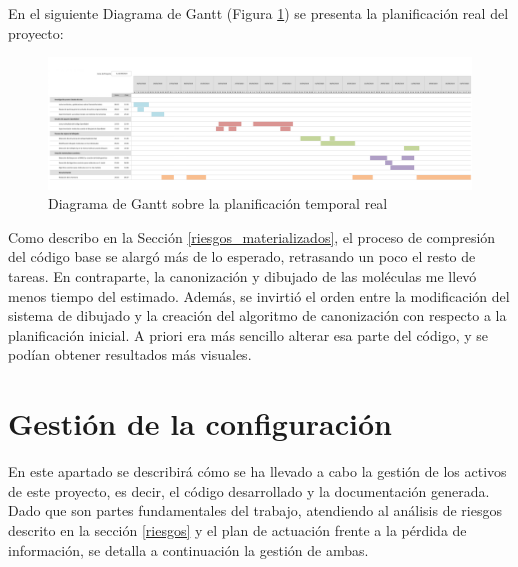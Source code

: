 \begin{landscape}

En el siguiente Diagrama de Gantt (Figura \ref{fig:gantt_real}) se presenta la planificación real del proyecto:

    \begin{figure}[h!]
        \centering
        \includegraphics[scale=0.9]{imagenes/planificacion/planificacion_real.png}
        \caption{Diagrama de Gantt sobre la planificación temporal real}
        \label{fig:gantt_real}
    \end{figure}
\end{landscape}

% 


Como describo en la Sección \ref{riesgos_materializados}, el proceso de compresión del código base se alargó más de lo esperado, retrasando un poco el resto de tareas. En contraparte, la canonización y dibujado de las moléculas me llevó menos tiempo del estimado. Además, se invirtió el orden entre la modificación del sistema de dibujado y la creación del algoritmo de canonización con respecto a la planificación inicial. A priori era más sencillo alterar esa parte del código, y se podían obtener resultados más visuales.

\section{Gestión de la configuración}
En este apartado se describirá cómo se ha llevado a cabo la gestión de los activos de este proyecto, es decir, el código desarrollado y la documentación generada. Dado que son partes fundamentales del trabajo, atendiendo al análisis de riesgos descrito en la sección \ref{riesgos} y el plan de actuación frente a la pérdida de información, se detalla a continuación la gestión de ambas.

